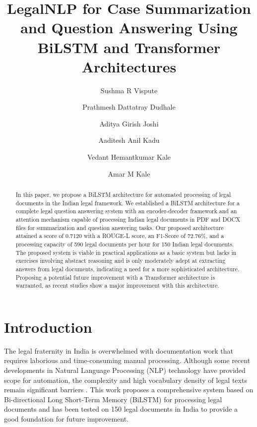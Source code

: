 \documentclass{llncs}
\begin{document}
\title{LegalNLP for Case Summarization and Question Answering Using BiLSTM and Transformer Architectures}

\author{Sushma R Vispute \and
Prathmesh Dattatray Dudhale \and
Aditya Girish Joshi \and
Aaditesh Anil Kadu \and
Vedant Hemantkumar Kale\and
Amar M Kale}


\maketitle

\begin{abstract}
In this paper, we propose a BiLSTM architecture for automated processing of legal documents in the Indian legal framework. We established a BiLSTM architecture for a complete legal question answering system with an encoder-decoder framework and an attention mechanism capable of processing Indian legal documents in PDF and DOCX files for summarization and question answering tasks. Our proposed architecture attained a score of 0.7120 with a ROUGE-L score, an F1-Score of 72.76\%, and a processing capacity of 590 legal documents per hour for 150 Indian legal documents. The proposed system is viable in practical applications as a basic system but lacks in exercises involving abstract reasoning and is only moderately adept at extracting answers from legal documents, indicating a need for a more sophisticated architecture. Proposing a potential future improvement with a Transformer architecture is warranted, as recent studies show a major improvement with this architecture.

\end{abstract}

\section{Introduction}

The legal fraternity in India is overwhelmed with documentation work that requires laborious and time-consuming manual processing. Although some recent developments in Natural Language Processing (NLP) technology have provided scope for automation, the complexity and high vocabulary density of legal texts remain significant barriers \cite{akter2025legal}. This work proposes a comprehensive system based on Bi-directional Long Short-Term Memory (BiLSTM) for processing legal documents and has been tested on 150 legal documents in India to provide a good foundation for future improvement.
\end{document}

